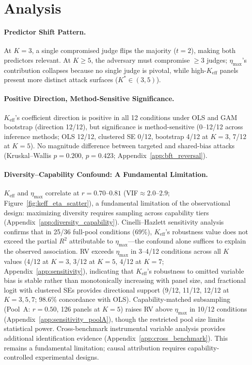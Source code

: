 \section{Analysis}
\label{sec:analysis}

\paragraph{Predictor Shift Pattern.}
At $K{=}3$, a single compromised judge flips the majority ($t{=}2$), making both predictors relevant. At $K{\geq}5$, the adversary must compromise ${\geq}3$ judges; $\eta_{\max}$'s contribution collapses because no single judge is pivotal, while high-$K_{\mathrm{eff}}$ panels present more distinct attack surfaces ($K^* \in (3,5)$).

\paragraph{Positive Direction, Method-Sensitive Significance.}
$K_{\mathrm{eff}}$'s coefficient direction is positive in all 12 conditions under OLS and GAM bootstrap (direction 12/12), but significance is method-sensitive (0--12/12 across inference methods; OLS 12/12, clustered SE 0/12, bootstrap 4/12 at $K{=}3$, 7/12 at $K{=}5$). No magnitude difference between targeted and shared-bias attacks (Kruskal--Wallis $p{=}0.200$, $p{=}0.423$; Appendix~\ref{app:bft_reversal}).

\paragraph{Diversity--Capability Confound: A Fundamental Limitation.}
$K_{\mathrm{eff}}$ and $\eta_{\max}$ correlate at $r{=}0.70$--$0.81$ (VIF${\approx}2.0$--$2.9$; Figure~\ref{fig:keff_eta_scatter}), a fundamental limitation of the observational design: maximizing diversity requires sampling across capability tiers (Appendix~\ref{app:diversity_capability}). Cinelli--Hazlett sensitivity analysis \citep{cinelli2020making} confirms that in 25/36 full-pool conditions (69\%), $K_{\mathrm{eff}}$'s robustness value does not exceed the partial $R^2$ attributable to $\eta_{\max}$---the confound alone suffices to explain the observed association. RV exceeds $\eta_{\max}$ in 3--4/12 conditions across all $K$ values (4/12 at $K{=}3$, 3/12 at $K{=}5$, 4/12 at $K{=}7$; Appendix~\ref{app:sensitivity}), indicating that $K_{\mathrm{eff}}$'s robustness to omitted variable bias is stable rather than monotonically increasing with panel size, and fractional logit with clustered SEs provides directional support (9/12, 11/12, 12/12 at $K{=}3,5,7$; 98.6\% concordance with OLS). Capability-matched subsampling (Pool~A: $r{=}0.50$, 126 panels at $K{=}5$) raises RV above $\eta_{\max}$ in 10/12 conditions (Appendix~\ref{app:sensitivity_poolA}), though the restricted pool size limits statistical power. Cross-benchmark instrumental variable analysis provides additional identification evidence (Appendix~\ref{app:cross_benchmark}). This remains a fundamental limitation; causal attribution requires capability-controlled experimental designs.

